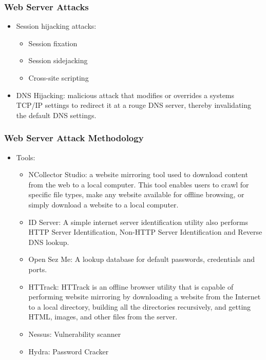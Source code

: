 \subsubsection{Web Server Attacks}
\begin{itemize}
    \item Session hijacking attacks:
    \begin{itemize}
        \item Session fixation
        \item Session sidejacking
        \item Cross-site scripting
    \end{itemize}
    \item DNS Hijacking: malicious attack that modifies or overrides a systems TCP/IP settings to redirect it at a rouge DNS server, thereby invalidating the default DNS settings.
\end{itemize}
\subsubsection{Web Server Attack Methodology}
\begin{itemize}
    \item Tools:
    \begin{itemize}
        \item NCollector Studio: a website mirroring tool used to download content from the web to a local computer. This tool enables users to crawl for specific file types, make any website available for offline browsing, or simply download a website to a local computer.
        \item ID Server: A simple internet server identification utility also performs HTTP Server Identification, Non-HTTP Server Identification and Reverse DNS lookup.
        \item Open Sez Me: A lookup database for default passwords, credentials and ports.
        \item HTTrack: HTTrack is an offline browser utility that is capable of performing website mirroring by downloading a website from the Internet to a local directory, building all the directories recursively, and getting HTML, images, and other files from the server.
        \item Nessus: Vulnerability scanner
        \item Hydra: Password Cracker
    \end{itemize}
\end{itemize}
